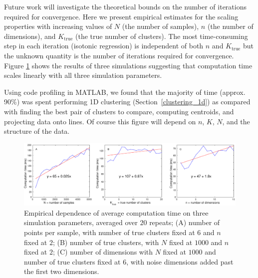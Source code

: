 \documentclass[10pt]{article}
\begin{document}
Future work will investigate the theoretical bounds on the number of iterations required for convergence. Here we present empirical estimates for the scaling properties with increasing values of $N$ (the number of samples), $n$ (the number of dimensions), and $K_\text{true}$ (the true number of clusters). The most time-consuming step in each iteration (isotonic regression) is independent of both $n$ and $K_\text{true}$ but the unknown quantity is the number of iterations required for convergence. Figure \ref{fig:computation_times_01} shows the results of three simulations suggesting that computation time scales linearly with all three simulation parameters.

Using code profiling in MATLAB, we found that the majority of time (approx. 90\%) was spent performing 1D clustering (Section~\ref{clustering_1d}) as compared with finding the best pair of clusters to compare, computing centroids, and projecting data onto lines. Of course this figure will depend on $n$, $K$, $N$, and the structure of the data.

\begin{figure}
\begin{center}
\includegraphics[width=5.5in]{images/computation_times_01.eps}
\end{center}
\caption{
Empirical dependence of average computation time on three simulation parameters, averaged over $20$ repeats; (A) number of points per sample, with number of true clusters fixed at $6$ and $n$ fixed at $2$; (B) number of true clusters, with $N$ fixed at $1000$ and $n$ fixed at $2$; (C) number of dimensions with $N$ fixed at $1000$ and number of true clusters fixed at $6$, with noise dimensions added past the first two dimensions.
}
\label{fig:computation_times_01}
\end{figure}
\end{document}
